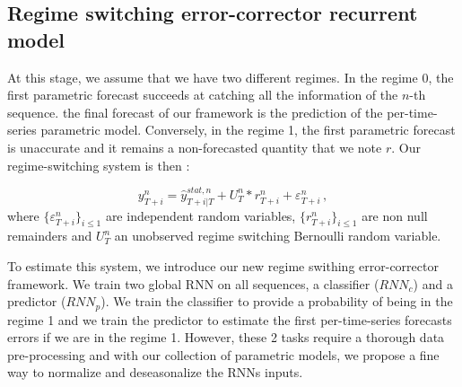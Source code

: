 \documentclass{article} %
\newcommand{\ts}{y}
\newcommand{\tspred}{\hat{\ts}}
\newcommand{\lag}{h}
\newcommand{\predictor}{RNN_p}
\newcommand{\classifier}{RNN_c}
\newcommand{\remainder}{r}
\newcommand{\hiddenregime}{U}
\begin{document}

\subsection{Regime switching error-corrector recurrent model}

At this stage, we assume that we have two different regimes. In the regime 0, the first parametric forecast succeeds at catching all the information of the $n$-th sequence. the final forecast of our framework is the prediction of the per-time-series parametric model. Conversely, in the regime 1, the first parametric forecast is unaccurate and it remains a non-forecasted quantity that we note $\remainder$. Our regime-switching system is then :

$$
\ts^n_{T+i} = \tspred^{stat,n}_{T+i|T} + \hiddenregime^n_T * \remainder^{n}_{T+i} + \varepsilon^n_{T+i}\,,
$$
where $\{\varepsilon^n_{T+i}\}_{i\leqslant 1}$ are independent random variables, $\{\remainder^n_{T+i}\}_{i\leqslant 1}$ are non null remainders and $U^n_T$ an unobserved regime switching Bernoulli random variable.

To estimate this system, we introduce our new regime swithing error-corrector framework. We train two global RNN on all sequences, a classifier ($\classifier$) and a predictor ($\predictor$). We train the classifier to provide a probability of being in the regime 1 and we train the predictor to estimate the first per-time-series forecasts errors if we are in the regime 1. However, these 2 tasks require a thorough data pre-processing and with our collection of parametric models, we propose a fine way to normalize and deseasonalize the RNNs inputs.
\end{document}

